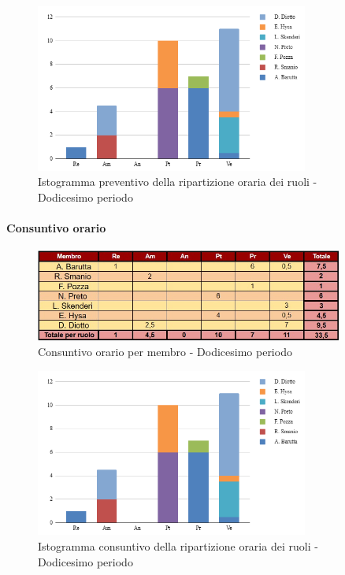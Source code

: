\begin{figure}[H]
    \centering
    \includegraphics[width=0.8\textwidth]{../Images/preventivoDivisioneRuoli12Periodo.png}
    \caption{Istogramma preventivo della ripartizione oraria dei ruoli - Dodicesimo periodo}
    \label{fig:Preventivo_ripartizione_oraria_12}
\end{figure}

\paragraph{Consuntivo orario}

\begin{figure}[H]
    \centering
    \includegraphics[width=0.9\textwidth]{../Images/consuntivoOrario12Periodo.jpeg}
    \caption{Consuntivo orario per membro - Dodicesimo periodo}
    \label{fig:Constuntivo_orario_12}
\end{figure}

\begin{figure}[H]
    \centering
    \includegraphics[width=0.8\textwidth]{../Images/consuntivoDivisioneRuoli12Periodo.png}
    \caption{Istogramma consuntivo della ripartizione oraria dei ruoli - Dodicesimo periodo}
    \label{fig:Consuntivo_ripartizione_oraria_12}
\end{figure}